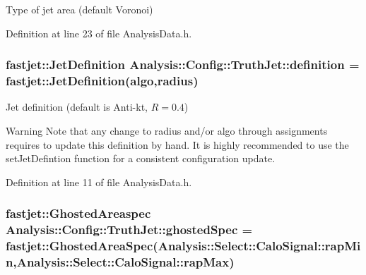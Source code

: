 Type of jet area (default Voronoi) 



Definition at line 23 of file Analysis\+Data.\+h.

\subsubsection[{\texorpdfstring{definition}{definition}}]{\setlength{\rightskip}{0pt plus 5cm}fastjet\+::\+Jet\+Definition Analysis\+::\+Config\+::\+Truth\+Jet\+::definition = fastjet\+::\+Jet\+Definition({\bf algo},{\bf radius})\hspace{0.3cm}{\ttfamily [static]}}\hypertarget{namespaceAnalysis_1_1Config_1_1TruthJet_a15280a9c639a88c02bf1e3794b6ec29d}{}\label{namespaceAnalysis_1_1Config_1_1TruthJet_a15280a9c639a88c02bf1e3794b6ec29d}


Jet definition (default is Anti-\/kt, $ R = 0.4 $) 

\begin{DoxyWarning}{Warning}
Note that any change to {\ttfamily radius} and/or {\ttfamily algo} through assignments requires to update this definition by hand. It is highly recommended to use the {\ttfamily set\+Jet\+Defintion} function for a consistent configuration update. 
\end{DoxyWarning}


Definition at line 11 of file Analysis\+Data.\+h.

\subsubsection[{\texorpdfstring{ghosted\+Spec}{ghostedSpec}}]{\setlength{\rightskip}{0pt plus 5cm}fastjet\+::\+Ghosted\+Areaspec Analysis\+::\+Config\+::\+Truth\+Jet\+::ghosted\+Spec = fastjet\+::\+Ghosted\+Area\+Spec({\bf Analysis\+::\+Select\+::\+Calo\+Signal\+::rap\+Min},{\bf Analysis\+::\+Select\+::\+Calo\+Signal\+::rap\+Max})\hspace{0.3cm}{\ttfamily [static]}}\hypertarget{namespaceAnalysis_1_1Config_1_1TruthJet_a661169c3a6db009e6993226459cf8124}{}\label{namespaceAnalysis_1_1Config_1_1TruthJet_a661169c3a6db009e6993226459cf8124}


